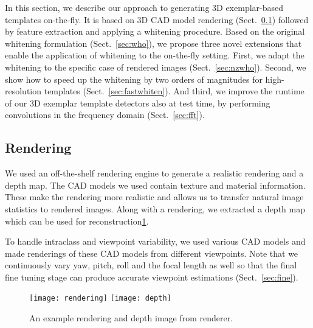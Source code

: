 In this section, we describe our approach to generating 3D
exemplar-based templates on-the-fly. It is based on 3D CAD model
rendering (Sect.~\ref{sec:rendering}) followed by feature extraction
and applying a whitening procedure. Based on the original whitening
formulation (Sect.~\ref{sec:who}), we propose three novel extensions that
enable the application of whitening to the on-the-fly setting.
%
First, we adapt the whitening to the specific case of rendered
images (Sect.~\ref{sec:nzwho}). Second, we show how to speed up the
whitening by two orders of magnitudes for high-resolution templates
(Sect.~\ref{sec:fastwhiten}). And third, we improve the runtime of our
3D exemplar template detectors also at test time, by performing
convolutions in the frequency domain (Sect.~\ref{sec:fft}).


\subsection{Rendering}
\label{sec:rendering}

We used an off-the-shelf rendering engine to generate a realistic rendering
and a depth map. The CAD models we used contain texture and material
information. These make the rendering more realistic and allows us to transfer
natural image statistics to rendered images. Along
with a rendering, we extracted a depth map which can be used for
reconstruction\ref{fig:rendering}.

To handle intraclass and viewpoint variability, we used various CAD models and
made renderings of these CAD models from different viewpoints.  Note that we
continuously vary yaw, pitch, roll and the focal length as well so that the
final fine tuning stage can produce accurate viewpoint estimations
(Sect.~\ref{sec:fine}).

\begin{figure}[t]
  \begin{center}
    \texttt{[image: rendering]}
    \texttt{[image: depth]}
  \end{center}
  \caption{An example rendering and depth image from renderer.}
  \label{fig:rendering}
\end{figure}


